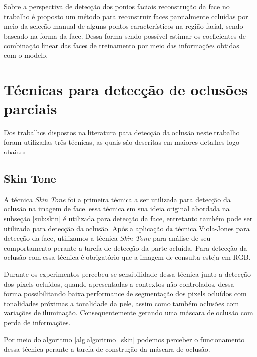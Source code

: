 Sobre a perspectiva de detecção dos pontos faciais reconstrução da face  no trabalho  é proposto um método para reconstruir faces parcialmente ocluídas por meio da seleção manual de alguns pontos característicos na região facial, sendo baseado na forma da face. Dessa forma sendo possível estimar os coeficientes de combinação linear das faces de treinamento por meio das informações obtidas com o modelo.	
 




\section{Técnicas para detecção de oclusões parciais}
Dos trabalhos dispostos na literatura para detecção da oclusão neste trabalho foram utilizadas três técnicas, as quais são descritas em maiores detalhes logo abaixo:

\subsection{Skin Tone}

A técnica \textit{Skin Tone} \cite{cheddad2009skin} foi a primeira técnica a ser utilizada para detecção da oclusão na imagem de face, essa técnica em sua ideia original abordada na subseção \ref{sub:skin} é utilizada para detecção da face, entretanto também pode ser utilizada para detecção da oclusão. Após a aplicação da técnica Viola-Jones para detecção da face, utilizamos a técnica \textit{Skin Tone} para análise de seu comportamento perante a tarefa de detecção da parte ocluída. Para detecção da oclusão com essa técnica é obrigatório que a imagem de consulta esteja em RGB.

Durante os experimentos percebeu-se sensibilidade dessa técnica junto a detecção dos pixels ocluídos, quando apresentadas a contextos não controlados, dessa forma possibilitando baixa performance de segmentação dos pixels ocluídos com tonalidades próximas a tonalidade da pele, assim como também oclusões com variações de iluminação. Consequentemente gerando uma máscara de oclusão com perda de informações.

Por meio do algoritmo \ref{alg:algoritmo_skin} podemos perceber o funcionamento dessa técnica perante a tarefa de construção da máscara de oclusão.

